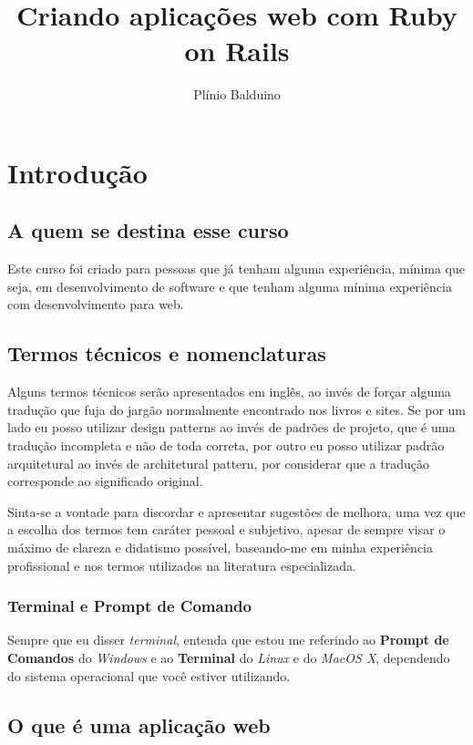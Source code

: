 \documentclass[12pt]{book} %
\title{Criando aplicações web com Ruby on Rails}
\author{Plínio Balduino}
\begin{document}
\lstset{language=Ruby}

\maketitle

\tableofcontents

\pagebreak

\chapter{Introdução}

\section{A quem se destina esse curso}
Este curso foi criado para pessoas que já tenham alguma experiência, mínima que seja, em desenvolvimento de software e que tenham alguma mínima experiência com desenvolvimento para web.
\section{Termos técnicos e nomenclaturas}

Alguns termos técnicos serão apresentados em inglês, ao invés de forçar alguma tradução que fuja do jargão normalmente encontrado nos livros e sites. Se por um lado eu posso utilizar design patterns ao invés de padrões de projeto, que é uma tradução incompleta e não de toda correta, por outro eu posso utilizar padrão arquitetural ao invés de architetural pattern, por considerar que a tradução corresponde ao significado original.

Sinta-se a vontade para discordar e apresentar sugestões de melhora, uma vez que a escolha dos termos tem caráter pessoal e subjetivo, apesar de sempre visar o máximo de clareza e didatismo possível, baseando-me em minha experiência profissional e nos termos utilizados na literatura especializada.

\subsection{Terminal e Prompt de Comando}

Sempre que eu disser \emph{terminal}, entenda que estou me referindo ao \textbf{Prompt de Comandos} do \emph{Windows} e ao \textbf{Terminal} do \emph{Linux} e do \emph{MacOS X}, dependendo do sistema operacional que você estiver utilizando. 

\section{O que é uma aplicação web}
\end{document}

